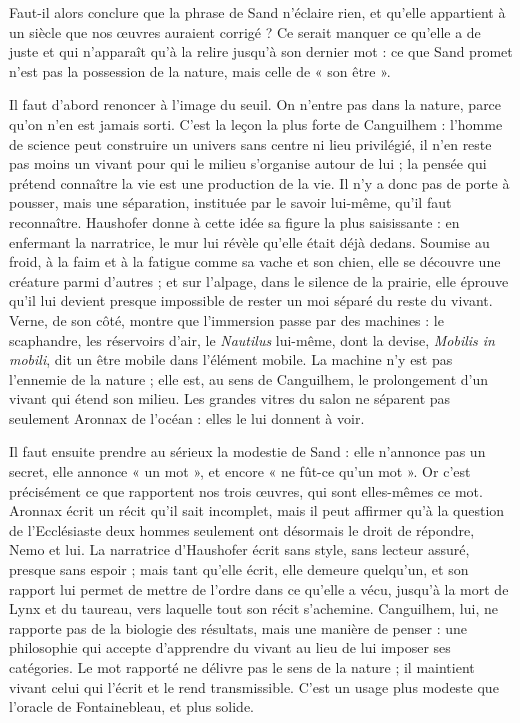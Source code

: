 \documentclass[11pt,a4paper]{article}
\begin{document}
Faut-il alors conclure que la phrase de Sand n'éclaire rien, et qu'elle appartient à un siècle que nos œuvres auraient corrigé ? Ce serait manquer ce qu'elle a de juste et qui n'apparaît qu'à la relire jusqu'à son dernier mot : ce que Sand promet n'est pas la possession de la nature, mais celle de « son être ».

Il faut d'abord renoncer à l'image du seuil. On n'entre pas dans la nature, parce qu'on n'en est jamais sorti. C'est la leçon la plus forte de Canguilhem : l'homme de science peut construire un univers sans centre ni lieu privilégié, il n'en reste pas moins un vivant pour qui le milieu s'organise autour de lui ; la pensée qui prétend connaître la vie est une production de la vie. Il n'y a donc pas de porte à pousser, mais une séparation, instituée par le savoir lui-même, qu'il faut reconnaître. Haushofer donne à cette idée sa figure la plus saisissante : en enfermant la narratrice, le mur lui révèle qu'elle était déjà dedans. Soumise au froid, à la faim et à la fatigue comme sa vache et son chien, elle se découvre une créature parmi d'autres ; et sur l'alpage, dans le silence de la prairie, elle éprouve qu'il lui devient presque impossible de rester un moi séparé du reste du vivant. Verne, de son côté, montre que l'immersion passe par des machines : le scaphandre, les réservoirs d'air, le \emph{Nautilus} lui-même, dont la devise, \emph{Mobilis in mobili}, dit un être mobile dans l'élément mobile. La machine n'y est pas l'ennemie de la nature ; elle est, au sens de Canguilhem, le prolongement d'un vivant qui étend son milieu. Les grandes vitres du salon ne séparent pas seulement Aronnax de l'océan : elles le lui donnent à voir.

Il faut ensuite prendre au sérieux la modestie de Sand : elle n'annonce pas un secret, elle annonce « un mot », et encore « ne fût-ce qu'un mot ». Or c'est précisément ce que rapportent nos trois œuvres, qui sont elles-mêmes ce mot. Aronnax écrit un récit qu'il sait incomplet, mais il peut affirmer qu'à la question de l'Ecclésiaste deux hommes seulement ont désormais le droit de répondre, Nemo et lui. La narratrice d'Haushofer écrit sans style, sans lecteur assuré, presque sans espoir ; mais tant qu'elle écrit, elle demeure quelqu'un, et son rapport lui permet de mettre de l'ordre dans ce qu'elle a vécu, jusqu'à la mort de Lynx et du taureau, vers laquelle tout son récit s'achemine. Canguilhem, lui, ne rapporte pas de la biologie des résultats, mais une manière de penser : une philosophie qui accepte d'apprendre du vivant au lieu de lui imposer ses catégories. Le mot rapporté ne délivre pas le sens de la nature ; il maintient vivant celui qui l'écrit et le rend transmissible. C'est un usage plus modeste que l'oracle de Fontainebleau, et plus solide.
\end{document}
